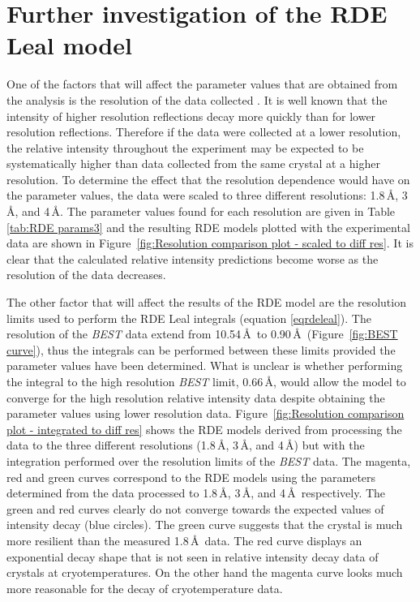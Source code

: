 \section{Further investigation of the RDE Leal model}
\label{sec:Further investigation of the RDE Leal model}

One of the factors that will affect the parameter values that are obtained from the analysis is the resolution of the data collected \cite{leal2012}.
It is well known that the intensity of higher resolution reflections decay more quickly than for lower resolution reflections.
Therefore if the data were collected at a lower resolution, the relative intensity throughout the experiment may be expected to be systematically higher than data collected from the same crystal at a higher resolution.
To determine the effect that the resolution dependence would have on the parameter values, the data were scaled to three different resolutions: 1.8\,\AA, 3\,\AA, and 4\,\AA.
The parameter values found for each resolution are given in Table \ref{tab:RDE params3} and the resulting RDE models plotted with the experimental data are shown in Figure~\ref{fig:Resolution comparison plot - scaled to diff res}.
It is clear that the calculated relative intensity predictions become worse as the resolution of the data decreases.

The other factor that will affect the results of the RDE model are the resolution limits used to perform the RDE Leal integrals (equation \ref{eqrdeleal}).
The resolution of the \textit{BEST} data extend from 10.54\,\AA\ to 0.90\,\AA\ (Figure~\ref{fig:BEST curve}), thus the integrals can be performed between these limits provided the parameter values have been determined.
What is unclear is whether performing the integral to the high resolution \textit{BEST} limit, 0.66\,\AA, would allow the model to converge for the high resolution relative intensity data despite obtaining the parameter values using lower resolution data.
Figure~\ref{fig:Resolution comparison plot - integrated to diff res} shows the RDE models derived from processing the data to the three different resolutions (1.8\,\AA, 3\,\AA, and 4\,\AA) but with the integration performed over the resolution limits of the \textit{BEST} data.
The magenta, red and green curves correspond to the RDE models using the parameters determined from the data processed to 1.8\,\AA, 3\,\AA, and 4\,\AA\ respectively.
The green and red curves clearly do not converge towards the expected values of intensity decay (blue circles).
The green curve suggests that the crystal is much more resilient than the measured 1.8$\,$\AA\ data.
The red curve displays an exponential decay shape that is not seen in relative intensity decay data of crystals at cryotemperatures.
On the other hand the magenta curve looks much more reasonable for the decay of cryotemperature data.

